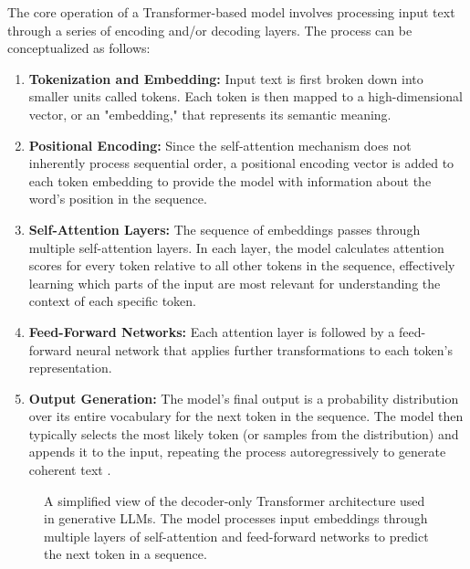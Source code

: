 The core operation of a Transformer-based model involves processing input text through a series of encoding and/or decoding layers. The process can be conceptualized as follows:
\begin{enumerate}
    \item \textbf{Tokenization and Embedding:} Input text is first broken down into smaller units called tokens. Each token is then mapped to a high-dimensional vector, or an "embedding," that represents its semantic meaning.
    \item \textbf{Positional Encoding:} Since the self-attention mechanism does not inherently process sequential order, a positional encoding vector is added to each token embedding to provide the model with information about the word's position in the sequence.
    \item \textbf{Self-Attention Layers:} The sequence of embeddings passes through multiple self-attention layers. In each layer, the model calculates attention scores for every token relative to all other tokens in the sequence, effectively learning which parts of the input are most relevant for understanding the context of each specific token.
    \item \textbf{Feed-Forward Networks:} Each attention layer is followed by a feed-forward neural network that applies further transformations to each token's representation.
    \item \textbf{Output Generation:} The model's final output is a probability distribution over its entire vocabulary for the next token in the sequence. The model then typically selects the most likely token (or samples from the distribution) and appends it to the input, repeating the process autoregressively to generate coherent text \cite{liu2023transformersurvey}.
\end{enumerate}

\begin{figure}[htbp]
  \centering
  \caption{A simplified view of the decoder-only Transformer architecture used in generative LLMs. The model processes input embeddings through multiple layers of self-attention and feed-forward networks to predict the next token in a sequence.}
  \label{fig:transformer_architecture}
\end{figure}

